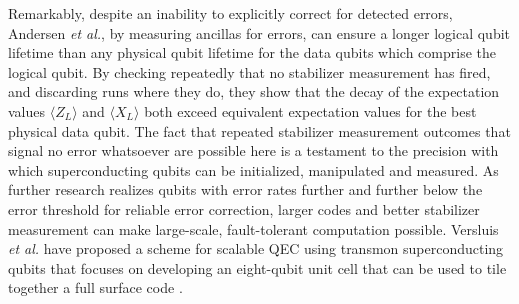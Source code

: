 

Remarkably, despite an inability to explicitly correct for detected errors,
Andersen \textit{et al.}, by measuring ancillas for errors, can ensure a longer
logical qubit lifetime than any physical qubit lifetime for the data qubits
which comprise the logical qubit. By checking repeatedly that no stabilizer
measurement has fired, and discarding runs where they do, they show that the
decay of the expectation values $\langle Z_L \rangle$ and $\langle X_L \rangle$
both exceed equivalent expectation values for the best physical data qubit. The
fact that repeated stabilizer measurement outcomes that signal no error
whatsoever are possible here is a testament to the precision with which
superconducting qubits can be initialized, manipulated and measured. As further
research realizes qubits with error rates further and further below the error
threshold for reliable error correction, larger codes and better stabilizer
measurement can make large-scale, fault-tolerant computation possible. Versluis
\textit{et al.} have proposed a scheme for scalable QEC using transmon
superconducting qubits that focuses on developing an eight-qubit unit cell that
can be used to tile together a full surface code \cite{Versluis_2017}.


